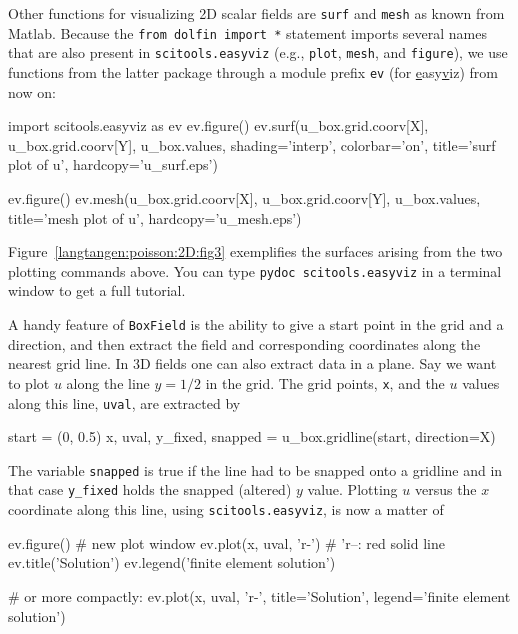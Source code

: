 Other functions for visualizing 2D scalar fields are {\fontsize{10pt}{10pt}\texttt{surf}} and
{\fontsize{10pt}{10pt}\texttt{mesh}} as known from Matlab. Because the {\fontsize{10pt}{10pt}\texttt{from dolfin import *}}
statement imports several names that are also present
in {\fontsize{10pt}{10pt}\texttt{scitools.easyviz}} (e.g., {\fontsize{10pt}{10pt}\texttt{plot}}, {\fontsize{10pt}{10pt}\texttt{mesh}}, and 
{\fontsize{10pt}{10pt}\texttt{figure}}), we use functions from the latter package through a
module prefix {\fontsize{10pt}{10pt}\texttt{ev}} (for \underline{e}asy\underline{v}iz) from now on:
\begin{python}
import scitools.easyviz as ev
ev.figure()
ev.surf(u_box.grid.coorv[X], u_box.grid.coorv[Y], u_box.values,
        shading='interp', colorbar='on', 
        title='surf plot of u', hardcopy='u_surf.eps')

ev.figure()
ev.mesh(u_box.grid.coorv[X], u_box.grid.coorv[Y], u_box.values,
        title='mesh plot of u', hardcopy='u_mesh.eps')
\end{python}
Figure~\ref{langtangen:poisson:2D:fig3} exemplifies the surfaces arising from
the two plotting commands above.
You can type
{\fontsize{10pt}{10pt}\texttt{pydoc scitools.easyviz}} in a terminal window
to get a full tutorial.

A handy feature of {\fontsize{10pt}{10pt}\texttt{BoxField}} is the ability to give a start point
in the grid and a direction, and then extract the field and corresponding
coordinates along the nearest grid
line. In 3D fields
one can also extract data in a plane.
Say we
want to plot $u$ along the line $y=1/2$ in the grid. The grid points,
{\fontsize{10pt}{10pt}\texttt{x}}, and the
$u$ values along this line, {\fontsize{10pt}{10pt}\texttt{uval}}, are extracted by
\begin{python}
start = (0, 0.5)
x, uval, y_fixed, snapped = u_box.gridline(start, direction=X)
\end{python}
The variable {\fontsize{10pt}{10pt}\texttt{snapped}} is true if the line had to be snapped onto a
gridline and in that case {\fontsize{10pt}{10pt}\verb!y_fixed!} holds the snapped 
(altered) $y$ value.
Plotting $u$ versus the $x$ coordinate along this line, using
{\fontsize{10pt}{10pt}\texttt{scitools.easyviz}}, is now a matter of
\begin{python}
ev.figure()  # new plot window
ev.plot(x, uval, 'r-')  # 'r--: red solid line
ev.title('Solution')
ev.legend('finite element solution')

# or more compactly:
ev.plot(x, uval, 'r-', title='Solution',
        legend='finite element solution')
\end{python}

